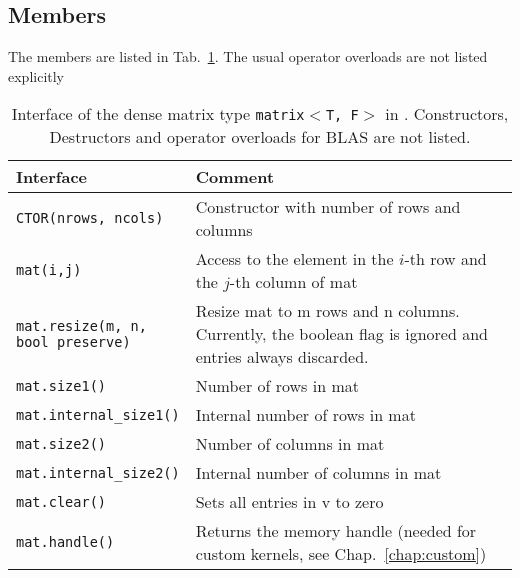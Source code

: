 
\subsection{Members}

The members are listed in Tab.~\ref{tab:matrix-interface}. The usual operator overloads are not listed explicitly

\begin{table}[tb]
\begin{center}
\begin{tabular}{p{6.5cm}|p{8.5cm}}
Interface & Comment\\
\hline
\texttt{CTOR(nrows, ncols)}    & Constructor with number of rows and columns \\
\texttt{mat(i,j)}    & Access to the element in the $i$-th row and the $j$-th column of mat \\
\parbox{6cm}{\texttt{mat.resize(m, n, \\
           \hphantom{mat.resize(}bool preserve)}}    & Resize mat to m rows and n columns. Currently, the boolean flag is ignored and entries always discarded. \\
\texttt{mat.size1()}            & Number of rows in mat \\
\texttt{mat.internal\_size1()}   & Internal number of rows in mat \\
\texttt{mat.size2()}            & Number of columns in mat \\
\texttt{mat.internal\_size2()}   & Internal number of columns in mat \\
\texttt{mat.clear()}   & Sets all entries in v to zero \\
\texttt{mat.handle()}  & Returns the memory handle (needed for custom kernels, see Chap.~\ref{chap:custom})
\end{tabular}
\caption{Interface of the dense matrix type \texttt{matrix$<$T, F$>$} in
\ViennaCL. Constructors, Destructors and operator overloads for BLAS are not
listed.}
\label{tab:matrix-interface}
\end{center}
\end{table}


